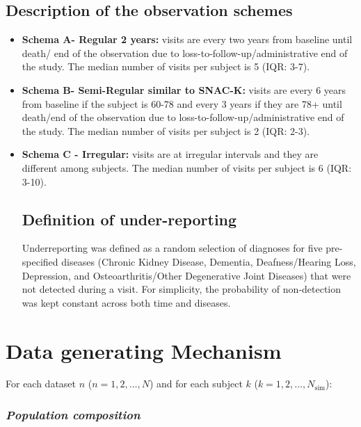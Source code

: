 \documentclass[
]{article}
\begin{document}
\hypertarget{description-of-the-observation-schemes}{%
\subsection{Description of the observation
schemes}\label{description-of-the-observation-schemes}}

\begin{itemize}
\item
  \textbf{Schema A- Regular 2 years:} visits are every two years from
  baseline until death/ end of the observation due to
  loss-to-follow-up/administrative end of the study. The median number
  of visits per subject is 5 (IQR: 3-7).
\item
  \textbf{Schema B- Semi-Regular similar to SNAC-K:} visits are every 6
  years from baseline if the subject is 60-78 and every 3 years if they
  are 78+ until death/end of the observation due to
  loss-to-follow-up/administrative end of the study. The median number
  of visits per subject is 2 (IQR: 2-3).
\item
  \textbf{Schema C - Irregular:} visits are at irregular intervals and
  they are different among subjects. The median number of visits per
  subject is 6 (IQR: 3-10).

  \hypertarget{definition-of-under-reporting}{%
  \subsection{Definition of
  under-reporting}\label{definition-of-under-reporting}}

  Underreporting was defined as a random selection of diagnoses for five
  pre-specified diseases (Chronic Kidney Disease, Dementia,
  Deafness/Hearing Loss, Depression, and Osteoarthritis/Other
  Degenerative Joint Diseases) that were not detected during a visit.
  For simplicity, the probability of non-detection was kept constant
  across both time and diseases.
\end{itemize}

\hypertarget{data-generating-mechanism}{%
\section{Data generating Mechanism}\label{data-generating-mechanism}}

For each dataset \(n\) (\(n = 1,2, \dots, N\)) and for each subject
\(k\) (\(k =1,2,\dots, N_{\text{sim}}\)):

\hypertarget{population-composition}{%
\subsubsection{\texorpdfstring{\textbf{\emph{Population
composition}}}{Population composition}}\label{population-composition}}
\end{document}
